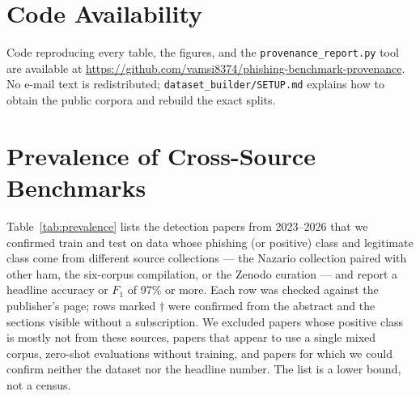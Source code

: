 \documentclass[twoside,11pt]{article}
\begin{document}
\section*{Code Availability}

Code reproducing every table, the figures, and the \texttt{provenance\_report.py}
tool are available at
\url{https://github.com/vamsi8374/phishing-benchmark-provenance}. No e-mail
text is redistributed; \texttt{dataset\_builder/SETUP.md} explains how to
obtain the public corpora and rebuild the exact splits.




\appendix
\section{Prevalence of Cross-Source Benchmarks}
\label{app:prevalence}

Table~\ref{tab:prevalence} lists the detection papers from 2023--2026 that we
confirmed train and test on data whose phishing (or positive) class and
legitimate class come from different source collections --- the Nazario
collection paired with other ham, the six-corpus compilation, or the Zenodo
curation --- and report a headline accuracy or $F_1$ of 97\% or more. Each row
was checked against the publisher's page; rows marked $\dagger$ were confirmed
from the abstract and the sections visible without a subscription. We
excluded papers whose positive class is mostly not from these sources, papers
that appear to use a single mixed corpus, zero-shot evaluations without
training, and papers for which we could confirm neither the dataset nor the
headline number. The list is a lower bound, not a census.
\end{document}
